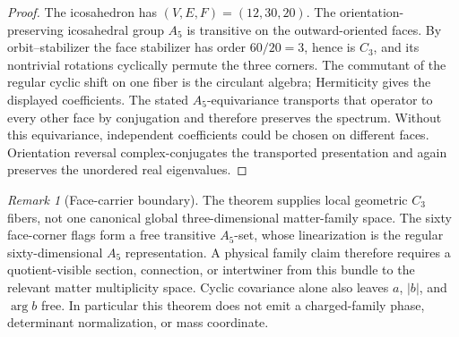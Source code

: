 \documentclass[11pt]{article}
\theoremstyle{remark}
\newtheorem{remark}[theorem]{Remark}
\theoremstyle{plain}
\begin{document}
\begin{proof}
The icosahedron has \((V,E,F)=(12,30,20)\).  The orientation-preserving
icosahedral group \(A_5\) is transitive on the outward-oriented faces.  By
orbit--stabilizer the face stabilizer has order \(60/20=3\), hence is
\(C_3\), and its nontrivial rotations cyclically permute the three corners.
The commutant of the regular cyclic shift on one fiber is the circulant
algebra; Hermiticity gives the displayed coefficients.  The stated
\(A_5\)-equivariance transports that operator to every other face by
conjugation and therefore preserves the spectrum.  Without this equivariance,
independent coefficients could be chosen on different faces.  Orientation
reversal complex-conjugates the transported presentation and again preserves
the unordered real eigenvalues.
\end{proof}

\begin{remark}[Face-carrier boundary]
The theorem supplies local geometric \(C_3\) fibers, not one canonical global
three-dimensional matter-family space.  The sixty face-corner flags form a
free transitive \(A_5\)-set, whose linearization is the regular
sixty-dimensional \(A_5\) representation.  A physical family claim therefore
requires a quotient-visible section, connection, or intertwiner from this
bundle to the relevant matter multiplicity space.  Cyclic covariance alone
also leaves \(a\), \(|b|\), and \(\arg b\) free.  In particular this theorem
does not emit a charged-family phase, determinant normalization, or mass
coordinate.
\end{remark}
\end{document}
